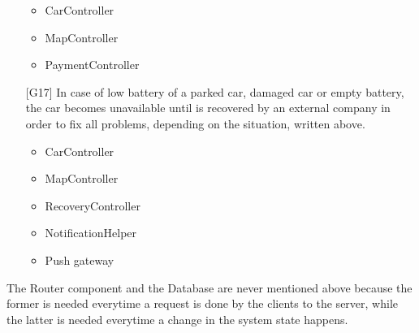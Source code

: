 \begin{itemize}
		\begin{itemize}
			\item CarController
			\item MapController
			\item PaymentController
		\end{itemize}
	\item[{[G17]}] In case of low battery of a parked car, damaged car or empty battery, the car becomes unavailable until is recovered by an external company in order to fix all problems, depending on the situation, written above. 
		\begin{itemize}
			\item CarController
			\item MapController
			\item RecoveryController
			\item NotificationHelper
			\item Push gateway
		\end{itemize}
\end{itemize}

The Router component and the Database are never mentioned above because the former is needed everytime a request is done by the clients to the server, while the latter is needed everytime a change in the system state happens.
